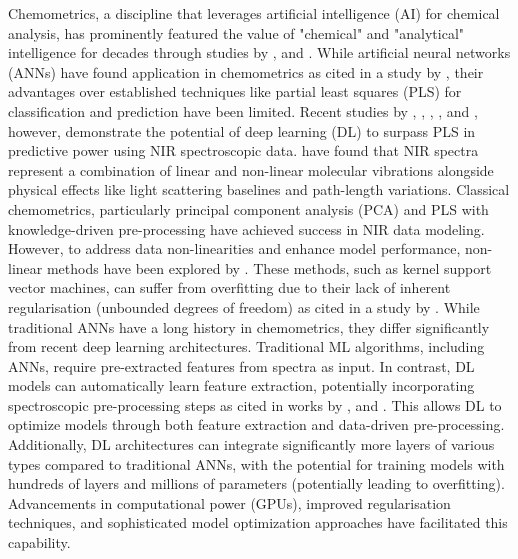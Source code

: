 \documentclass[10pt, a4paper, oneside]{article}
\begin{document}
Chemometrics, a discipline that leverages artificial intelligence (AI) for chemical analysis, has prominently featured the value of "chemical" and "analytical" intelligence for decades through studies by \cite{marini2009artificial}, and \cite{marini2008artificial}. While artificial neural networks (ANNs) have found application in chemometrics as cited in a study by \cite{debus2021deep}, their advantages over established techniques like partial least squares (PLS) for classification and prediction have been limited. Recent studies by  \cite{cui2018modern}, \cite{ng2020influence}, \cite{ng2019convolutional}, \cite{mishra2021synergistic}, and \cite{einarson2022predicting}, however, demonstrate the potential of deep learning (DL) to surpass PLS in predictive power using NIR spectroscopic data. \cite{anderson2020achieving} have found that NIR spectra represent a combination of linear and non-linear molecular vibrations alongside physical effects like light scattering baselines and path-length variations. Classical chemometrics, particularly principal component analysis (PCA) and PLS with knowledge-driven pre-processing have achieved success in NIR data modeling. However, to address data non-linearities and enhance model performance, non-linear methods have been explored by \cite{smits1994using}. These methods, such as kernel support vector machines, can suffer from overfitting due to their lack of inherent regularisation (unbounded degrees of freedom) as cited in a study by \cite{melssen1994using}. While traditional ANNs have a long history in chemometrics, they differ significantly from recent deep learning architectures. Traditional ML algorithms, including ANNs, require pre-extracted features from spectra as input. In contrast, DL models can automatically learn feature extraction, potentially incorporating spectroscopic pre-processing steps as cited in works by \cite{acquarelli2017convolutional}, and \cite{helin2022possible}. This allows DL to optimize models through both feature extraction and data-driven pre-processing. Additionally, DL architectures can integrate significantly more layers of various types compared to traditional ANNs, with the potential for training models with hundreds of layers and millions of parameters (potentially leading to overfitting). Advancements in computational power (GPUs), improved regularisation techniques, and sophisticated model optimization approaches have facilitated this capability. 
\end{document}
